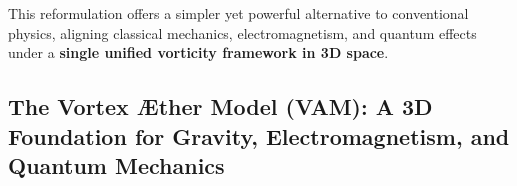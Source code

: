 \documentclass[a4paper,10pt]{article}
\begin{document}
This reformulation offers a simpler yet powerful alternative to conventional physics, aligning classical mechanics, electromagnetism, and quantum effects under a \textbf{single unified vorticity framework in 3D space}.




\subsection{The Vortex Æther Model (VAM): A 3D Foundation for Gravity, Electromagnetism, and Quantum Mechanics}\label{subsec:the-vortex-ther-model-(vam):-a-3d-foundation-for-gravity-electromagnetism-and-quantum-mechanics}


\begin{abstract}
        The Vortex Æther Model (VAM) offers an alternative framework that eliminates the need for 4D spacetime curvature (General Relativity) and higher-dimensional gauge theories (such as Kaluza-Klein theories). Instead, VAM asserts that structured vorticity fields in a non-viscous Æther fully encode gravitational, electromagnetic, and quantum effects within a 3D framework. This paper explores how VAM replaces traditional extra dimensions by using helicity conservation, vorticity-induced force interactions, and vortex-driven quantization mechanisms.
    \end{abstract}
\end{document}
